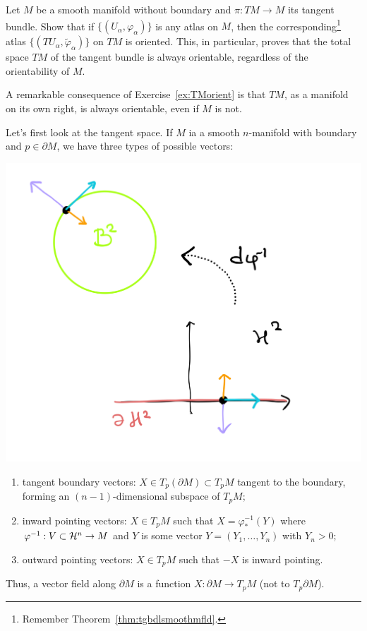 \begin{exercise}\label{ex:TMorient}
  Let $M$ be a smooth manifold without boundary and $\pi: TM \to M$ its tangent bundle.
  Show that if $\{(U_\alpha,\varphi_\alpha)\}$ is any atlas on $M$, then the corresponding\footnote{Remember Theorem~\ref{thm:tgbdlsmoothmfld}.} atlas $\{(TU_\alpha, \widetilde\varphi_\alpha)\}$ on $TM$ is oriented.
  This, in particular, proves that the total space $TM$ of the tangent bundle is always orientable, regardless of the orientability of $M$.
\end{exercise}

A remarkable consequence of Exercise~\ref{ex:TMorient} is that $TM$, as a manifold on its own right, is always orientable, even if $M$ is not. 


Let's first look at the tangent space. 
If $M$ ia a smooth $n$-manifold with boundary and $p\in \partial M$, we have three types of possible vectors:
\begin{marginfigure}
  \includegraphics{images/8_2-boundary-vectors.pdf}
\end{marginfigure}
\begin{enumerate}
  \item tangent boundary vectors: $X\in T_p(\partial M)\subset T_p M$ tangent to the boundary, forming an $(n-1)$-dimensional subspace of $T_p M$;
  \item inward pointing vectors: $X\in T_pM$ such that $X = \varphi^{-1}_*(Y)$ where $\varphi^{-1}: V\subset \mathcal{H}^n \to M$ and $Y$ is some vector $Y = (Y_1, \ldots, Y_n)$ with $Y_n > 0$;
  \item outward pointing vectors: $X\in T_pM$ such that $-X$ is inward pointing.
\end{enumerate}
Thus, a vector field along $\partial M$ is a function $X:\partial M\to T_pM$ (not to $T_p\partial M$).

